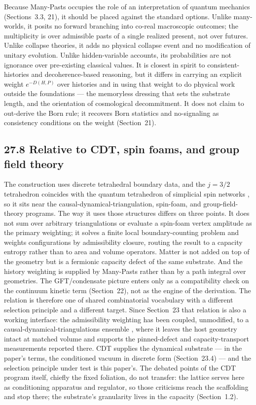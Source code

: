 \documentclass[11pt]{article}
\begin{document}
Because Many-Pasts occupies the role of an interpretation of quantum mechanics (Sections~3.3, 21), it should be placed against the standard options. Unlike many-worlds, it posits no forward branching into co-real macroscopic outcomes; the multiplicity is over admissible pasts of a single realized present, not over futures. Unlike collapse theories, it adds no physical collapse event and no modification of unitary evolution. Unlike hidden-variable accounts, its probabilities are not ignorance over pre-existing classical values. It is closest in spirit to consistent-histories and decoherence-based reasoning, but it differs in carrying an explicit weight $e^{-D(H,P)}$ over histories and in using that weight to do physical work outside the foundations --- the memoryless dressing that sets the substrate length, and the orientation of cosmological decommitment. It does not claim to out-derive the Born rule; it recovers Born statistics and no-signaling as consistency conditions on the weight (Section~21).

\subsection{27.8 Relative to CDT, spin foams, and group field theory}

The construction uses discrete tetrahedral boundary data, and the $j=3/2$ tetrahedron coincides with the quantum tetrahedron of simplicial spin networks \citep{Barbieri1998,BaezBarrett1999,RovelliSmolin1995}, so it sits near the causal-dynamical-triangulation, spin-foam, and group-field-theory programs. The way it uses those structures differs on three points. It does not sum over arbitrary triangulations or evaluate a spin-foam vertex amplitude as the primary weighting; it solves a finite local boundary-counting problem and weights configurations by admissibility closure, routing the result to a capacity entropy rather than to area and volume operators. Matter is not added on top of the geometry but is a fermionic capacity defect of the same substrate. And the history weighting is supplied by Many-Pasts rather than by a path integral over geometries. The GFT/condensate picture enters only as a compatibility check on the continuum kinetic term (Section~22), not as the engine of the derivation. The relation is therefore one of shared combinatorial vocabulary with a different selection principle and a different target. Since Section~23 that relation is also a working interface: the admissibility weighting has been coupled, unmodified, to a causal-dynamical-triangulations ensemble \citep{AmbjornJurkiewiczLoll2004,AmbjornGJL2012}, where it leaves the host geometry intact at matched volume and supports the pinned-defect and capacity-transport measurements reported there. CDT supplies the dynamical substrate --- in the paper's terms, the conditioned vacuum in discrete form (Section~23.4) --- and the selection principle under test is this paper's. The debated points of the CDT program itself, chiefly the fixed foliation, do not transfer: the lattice serves here as conditioning apparatus and regulator, so those criticisms reach the scaffolding and stop there; the substrate's granularity lives in the capacity (Section~1.2).
\end{document}
